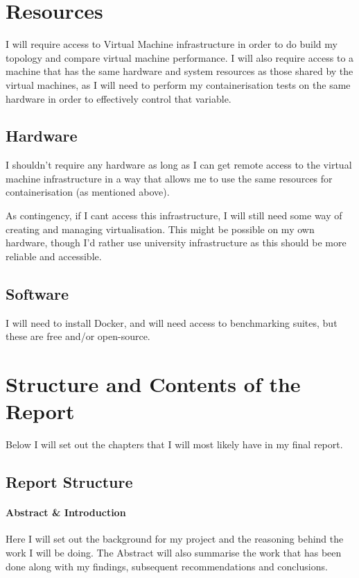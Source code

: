 \section{Resources}
I will require access to Virtual Machine infrastructure in order to do build my topology and compare virtual machine performance.
I will also require access to a machine that has the same hardware and system resources as those shared by the virtual machines, as I will need to perform my containerisation tests on the same hardware in order to effectively control that variable.

\subsection{Hardware}
I shouldn't require any hardware as long as I can get remote access to the virtual machine infrastructure in a way that allows me to use the same resources for containerisation (as mentioned above).

As contingency, if I cant access this infrastructure, I will still need some way of creating and managing virtualisation. This might be possible on my own hardware, though I'd rather use university infrastructure as this should be more reliable and accessible.

\subsection{Software}
I will need to install Docker, and will need access to benchmarking suites, but these are free and/or open-source.

\section{Structure and Contents of the Report}
Below I will set out the chapters that I will most likely have in my final report.
\subsection{Report Structure}

\paragraph{Abstract \& Introduction}  Here I will set out the background for my project and the reasoning behind the work I will be doing. The Abstract will also summarise the work that has been done along with my findings, subsequent recommendations and conclusions.

